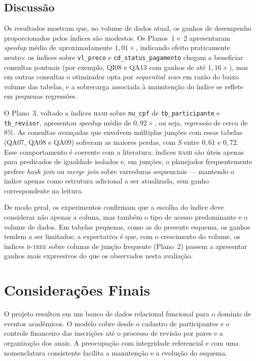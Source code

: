 \documentclass[12pt]{article}
\begin{document}


\subsection{Discussão}
\label{subsec:discussao}
Os resultados mostram que, no volume de dados atual, os ganhos de desempenho
proporcionados pelos índices são modestos. Os Planos~1 e~2 apresentaram
\emph{speedup} médio de aproximadamente $1{,}01\times$, indicando efeito
praticamente neutro: os índices sobre \texttt{vl\_preco} e \texttt{cd\_status\_pagamento}
chegam a beneficiar consultas pontuais (por exemplo, QI08 e QA13 com ganhos de
até $1{,}16\times$), mas em outras consultas o otimizador opta por
\emph{sequential scan} em razão do baixo volume das tabelas, e a sobrecarga
associada à manutenção do índice se reflete em pequenas regressões.

O Plano~3, voltado a índices \textsc{hash} sobre \texttt{nu\_cpf} de
\texttt{tb\_participante} e \texttt{tb\_revisor}, apresentou \emph{speedup} médio
de $0{,}92\times$, ou seja, \emph{regressão} de cerca de 8\%. As consultas
avançadas que envolvem múltiplas junções com essas tabelas (QA07, QA08 e QA09)
sofreram as maiores perdas, com $S$ entre $0{,}61$ e $0{,}72$. Esse comportamento
é coerente com a literatura: índices \textsc{hash} são úteis apenas para
predicados de igualdade isolados e, em junções, o planejador frequentemente
prefere \emph{hash join} ou \emph{merge join} sobre varreduras sequenciais ---
mantendo o índice apenas como estrutura adicional a ser atualizada, sem ganho
correspondente na leitura.

De modo geral, os experimentos confirmam que a escolha do índice deve considerar
não apenas a coluna, mas também o tipo de acesso predominante e o volume de
dados. Em tabelas pequenas, como as do presente esquema, os ganhos tendem a ser
limitados; a expectativa é que, com o crescimento do volume, os índices
\textsc{b-tree} sobre colunas de junção frequente (Plano~2) passem a apresentar
ganhos mais expressivos do que os observados nesta avaliação.

\section{Considerações Finais}
\label{sec:conclusao}

O projeto resultou em um banco de dados relacional funcional para o domínio de eventos acadêmicos. O modelo cobre desde o cadastro de participantes e o controle financeiro das inscrições até o processo de revisão por pares e a organização dos anais. A preocupação com integridade referencial e com uma nomenclatura consistente facilita a manutenção e a evolução do esquema.
\end{document}
